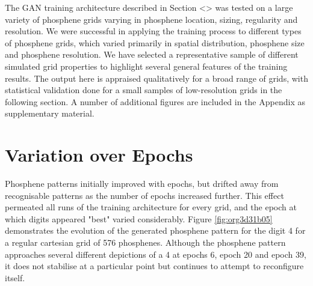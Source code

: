 \documentclass[a4paper,11pt,openany]{book}
\begin{document}
The GAN training architecture described in Section <> was tested on a large variety of phosphene grids varying in phosphene location, sizing, regularity and resolution.
We were successful in applying the training process to different types of phosphene grids, which varied primarily in spatial distribution, phosphene size and phosphene resolution.
We have selected a representative sample of different simulated grid properties to highlight several general features of the training results.
The output here is appraised qualitatively for a broad range of grids, with statistical validation done for a small samples of low-resolution grids in the following section.
A number of additional figures are included in the Appendix as supplementary material.

\section*{Variation over Epochs}
\label{sec:orga9f1f91}

Phosphene patterns initially improved with epochs, but drifted away from recognisable patterns as the number of epochs increased further.
This effect permeated all runs of the training architecture for every grid, and the epoch at which digits appeared "best" varied considerably.
Figure \ref{fig:org3d31b05} demonstrates the evolution of the generated phosphene pattern for the digit 4 for a regular cartesian grid of 576 phosphenes.
Although the phosphene pattern approaches several different depictions of a 4 at epochs 6, epoch 20 and epoch 39, it does not stabilise at a particular point but continues to attempt to reconfigure itself.
\end{document}
